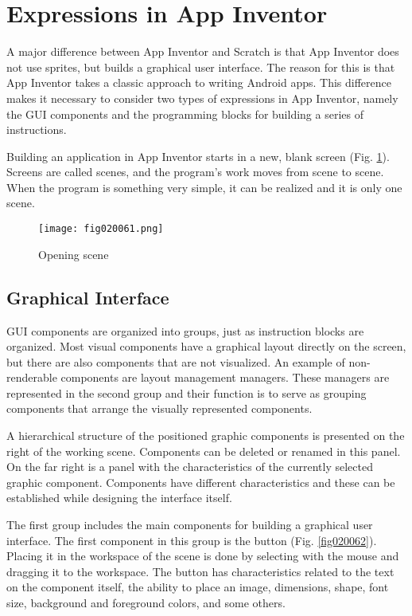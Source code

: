 \section{Expressions in App Inventor}

A major difference between App Inventor and Scratch is that App Inventor does not use sprites, but builds a graphical user interface. The reason for this is that App Inventor takes a classic approach to writing Android apps. This difference makes it necessary to consider two types of expressions in App Inventor, namely the GUI components and the programming blocks for building a series of instructions.

Building an application in App Inventor starts in a new, blank screen (Fig. \ref{fig020061}). Screens are called scenes, and the program's work moves from scene to scene. When the program is something very simple, it can be realized and it is only one scene.

\begin{figure}[H]
   \centering
   \texttt{[image: fig020061.png]}
   \caption{Opening scene}
\label{fig020061}
\end{figure}

\subsection{Graphical Interface}

GUI components are organized into groups, just as instruction blocks are organized. Most visual components have a graphical layout directly on the screen, but there are also components that are not visualized. An example of non-renderable components are layout management managers. These managers are represented in the second group and their function is to serve as grouping components that arrange the visually represented components.

A hierarchical structure of the positioned graphic components is presented on the right of the working scene. Components can be deleted or renamed in this panel. On the far right is a panel with the characteristics of the currently selected graphic component. Components have different characteristics and these can be established while designing the interface itself.

The first group includes the main components for building a graphical user interface. The first component in this group is the button (Fig. \ref{fig020062}). Placing it in the workspace of the scene is done by selecting with the mouse and dragging it to the workspace. The button has characteristics related to the text on the component itself, the ability to place an image, dimensions, shape, font size, background and foreground colors, and some others.

